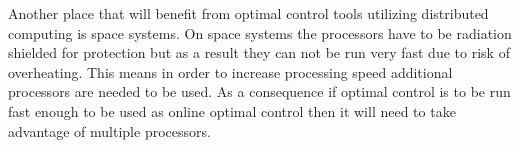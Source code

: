 \documentclass[12pt]{article}
\begin{document}
    Another place that will benefit from optimal control tools utilizing
distributed computing is space systems. On space systems the processors
have to be radiation shielded for protection but as a result they can not
be run very fast due to risk of overheating. This means in order to
increase processing speed additional processors are needed to be used. As a
consequence if optimal control is to be run fast enough to be used as online
optimal control then it will need to take advantage of multiple processors.

\end{document}
